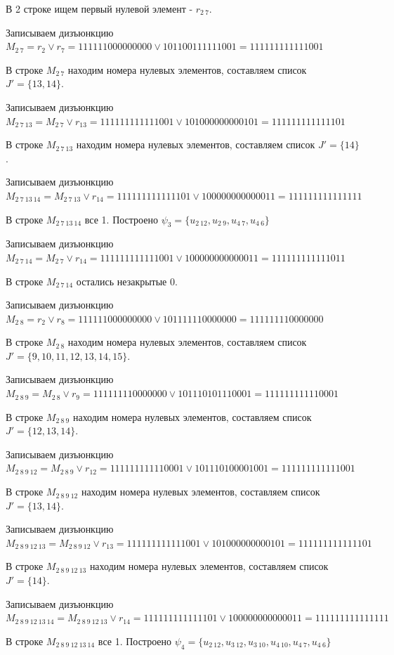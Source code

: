 \documentclass{article}
\begin{document}
В 2 строке ищем первый нулевой элемент - $r_{2\ 7}$.

Записываем дизъюнкцию $M_{2\ 7} = r_{2}\lor r_{7} = 111111000000000 \lor 101100111111001 = 111111111111001$

В строке $M_{2\ 7}$ находим номера нулевых элементов, составляем список $J' = \{13, 14\}$.

Записываем дизъюнкцию $M_{2\ 7\ 13} = M_{2\ 7}\lor r_{13} = 111111111111001 \lor 101000000000101 = 111111111111101$

В строке $M_{2\ 7\ 13}$ находим номера нулевых элементов, составляем список $J' = \{14\}$.

Записываем дизъюнкцию $M_{2\ 7\ 13\ 14} = M_{2\ 7\ 13}\lor r_{14} = 111111111111101 \lor 100000000000011 = 111111111111111$

В строке $M_{2\ 7\ 13\ 14}$ все 1. Построено $\psi_{3} = \{u_{2\ 12},u_{2\ 9},u_{4\ 7},u_{4\ 6}\}$

Записываем дизъюнкцию $M_{2\ 7\ 14} = M_{2\ 7}\lor r_{14} = 111111111111001 \lor 100000000000011 = 111111111111011$

В строке $M_{2\ 7\ 14}$ остались незакрытые 0.

Записываем дизъюнкцию $M_{2\ 8} = r_{2}\lor r_{8} = 111111000000000 \lor 101111110000000 = 111111110000000$

В строке $M_{2\ 8}$ находим номера нулевых элементов, составляем список $J' = \{9, 10, 11, 12, 13, 14, 15\}$.

Записываем дизъюнкцию $M_{2\ 8\ 9} = M_{2\ 8}\lor r_{9} = 111111110000000 \lor 101110101110001 = 111111111110001$

В строке $M_{2\ 8\ 9}$ находим номера нулевых элементов, составляем список $J' = \{12, 13, 14\}$.

Записываем дизъюнкцию $M_{2\ 8\ 9\ 12} = M_{2\ 8\ 9}\lor r_{12} = 111111111110001 \lor 101110100001001 = 111111111111001$

В строке $M_{2\ 8\ 9\ 12}$ находим номера нулевых элементов, составляем список $J' = \{13, 14\}$.

Записываем дизъюнкцию $M_{2\ 8\ 9\ 12\ 13} = M_{2\ 8\ 9\ 12}\lor r_{13} = 111111111111001 \lor 101000000000101 = 111111111111101$

В строке $M_{2\ 8\ 9\ 12\ 13}$ находим номера нулевых элементов, составляем список $J' = \{14\}$.

Записываем дизъюнкцию $M_{2\ 8\ 9\ 12\ 13\ 14} = M_{2\ 8\ 9\ 12\ 13}\lor r_{14} = 111111111111101 \lor 100000000000011 = 111111111111111$

В строке $M_{2\ 8\ 9\ 12\ 13\ 14}$ все 1. Построено $\psi_{4} = \{u_{2\ 12},u_{3\ 12},u_{3\ 10},u_{4\ 10},u_{4\ 7},u_{4\ 6}\}$
\end{document}
